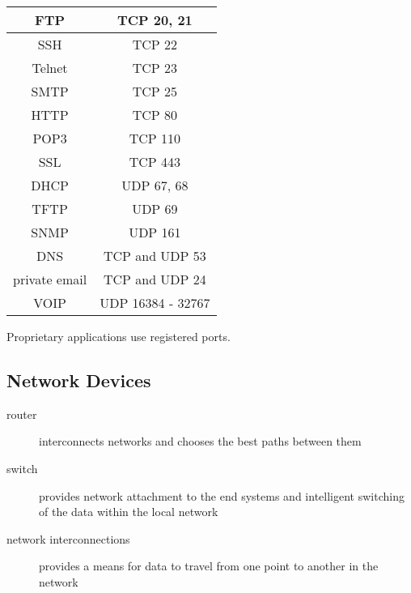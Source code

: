 \begin{tabular}{ | c | c | }
\hline
FTP & TCP 20, 21 \\ \hline
SSH & TCP 22 \\ \hline
Telnet & TCP 23 \\ \hline
SMTP & TCP 25 \\ \hline
HTTP & TCP 80 \\ \hline
POP3 & TCP 110 \\ \hline
SSL & TCP 443 \\ \hline
\hline
DHCP & UDP 67, 68 \\ \hline
TFTP & UDP 69 \\ \hline
SNMP & UDP 161 \\ \hline
\hline
DNS & TCP and UDP 53 \\ \hline
private email & TCP and UDP 24 \\ \hline
\hline
VOIP & UDP 16384 - 32767 \\ \hline
\end{tabular}

Proprietary applications use registered ports.

\subsection{Network Devices}

\begin{description}

\item[router]
interconnects networks and chooses the best paths between them

\item[switch]
provides network attachment to the end systems and intelligent switching of
the data within the local network

\item[network interconnections]
 provides a means for data to travel from one point to another in the network

\end{description}
